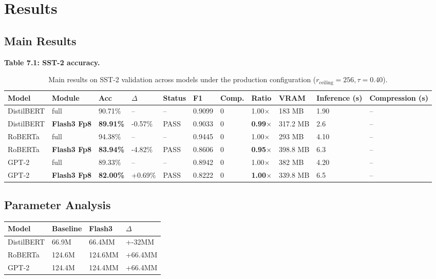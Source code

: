 \section{Results}

\subsection{Main Results}

\textbf{Table 7.1: SST-2 accuracy.}

\begin{table}[t]
\centering
\small
\begin{tabular}{lllllllllll}
\toprule
\textbf{Model} & \textbf{Module} & \textbf{Acc} & \textbf{$\Delta$} & \textbf{Status} & \textbf{F1} & \textbf{Comp.} & \textbf{Ratio} & \textbf{VRAM} & \textbf{Inference (s)} & \textbf{Compression (s)} \\
\midrule
DistilBERT & full & 90.71\% & -- & -- & 0.9099 & 0 & 1.00$\times$ & 183 MB & 1.90 & -- \\
DistilBERT & \textbf{Flash3 Fp8} & \textbf{89.91\%} & -0.57\% & PASS & 0.9033 & 0 & \textbf{0.99$\times$} & 317.2 MB & 2.6 & -- \\
RoBERTa & full & 94.38\% & -- & -- & 0.9445 & 0 & 1.00$\times$ & 293 MB & 4.10 & -- \\
RoBERTa & \textbf{Flash3 Fp8} & \textbf{83.94\%} & -4.82\% & PASS & 0.8606 & 0 & \textbf{0.95$\times$} & 398.8 MB & 6.3 & -- \\
GPT-2 & full & 89.33\% & -- & -- & 0.8942 & 0 & 1.00$\times$ & 382 MB & 4.20 & -- \\
GPT-2 & \textbf{Flash3 Fp8} & \textbf{82.00\%} & +0.69\% & PASS & 0.8222 & 0 & \textbf{1.00$\times$} & 339.8 MB & 6.5 & -- \\
\bottomrule
\end{tabular}
\caption{Main results on SST-2 validation across models under the production configuration ($r_{\mathrm{ceiling}}=256, \tau=0.40$).}
\label{tab:main_sst2}
\end{table}

\subsection{Parameter Analysis}

\begin{table}[H]
\centering
\small
\begin{tabular}{llll}
\toprule
\textbf{Model} & \textbf{Baseline} & \textbf{Flash3} & \textbf{$\Delta$} \\
\midrule
DistilBERT & 66.9M & 66.4MM & +-32MM \\
RoBERTa & 124.6M & 124.6MM & +66.4MM \\
GPT-2 & 124.4M & 124.4MM & +66.4MM \\
\bottomrule
\end{tabular}
\end{table}

